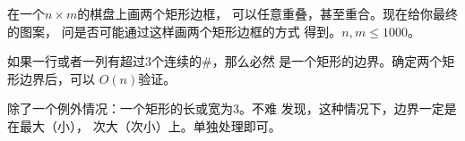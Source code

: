 \begin{prob}
	在一个$n \times m$的棋盘上画两个矩形边框，
	可以任意重叠，甚至重合。现在给你最终的图案，
	问是否可能通过这样画两个矩形边框的方式
	得到。$n, m \le 1000$。
\end{prob}

\begin{sol}
	如果一行或者一列有超过3个连续的\#，那么必然
	是一个矩形的边界。确定两个矩形边界后，可以
	$O(n)$验证。\par
	除了一个例外情况：一个矩形的长或宽为3。不难
	发现，这种情况下，边界一定是在最大（小），
	次大（次小）上。单独处理即可。
\end{sol}
